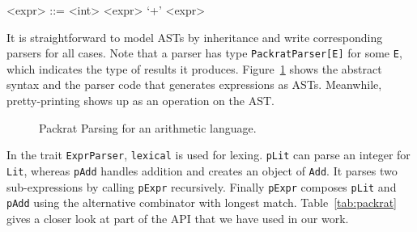 \setlength{\grammarindent}{5em}
\begin{grammar}
<expr> ::= <int>
    \alt <expr> `+' <expr>
\end{grammar}

It is straightforward to model ASTs by inheritance and write corresponding parsers for all cases.
Note that a parser has type \lstinline{PackratParser[E]} for some
\lstinline{E}, which indicates the type of results it produces. Figure~\ref{fig:packrat-arith} shows the abstract syntax and
the parser code that generates expressions as ASTs. Meanwhile, pretty-printing shows up as an operation on the AST.


\begin{figure}[t]
\centering
\caption{Packrat Parsing for an arithmetic language.}\label{fig:packrat-arith}
\end{figure}


In the trait \lstinline{ExprParser}, \lstinline{lexical} is used for lexing. \lstinline{pLit} can parse an integer for \lstinline{Lit},
whereas \lstinline{pAdd} handles addition and creates an object of \lstinline{Add}. It parses two sub-expressions by calling \lstinline{pExpr}
recursively. Finally \lstinline{pExpr} composes \lstinline{pLit} and \lstinline{pAdd} using the alternative combinator with longest match.
Table~\ref{tab:packrat} gives a closer look at part of the API that we have used in our work.

